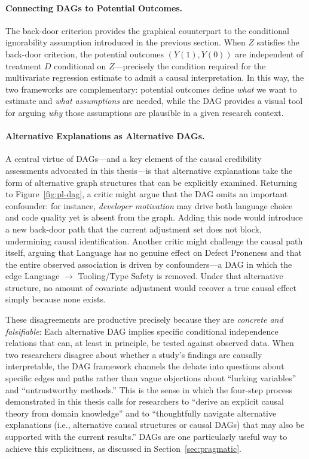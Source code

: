 \paragraph{Connecting DAGs to Potential Outcomes.}
The back-door criterion provides the graphical counterpart to the conditional ignorability assumption introduced in the previous section.
When $Z$ satisfies the back-door criterion, the potential outcomes $(Y(1), Y(0))$ are independent of treatment $D$ conditional on $Z$---precisely the condition required for the multivariate regression estimate to admit a causal interpretation.
In this way, the two frameworks are complementary: potential outcomes define \emph{what} we want to estimate and \emph{what assumptions} are needed, while the DAG provides a visual tool for arguing \emph{why} those assumptions are plausible in a given research context.

\paragraph{Alternative Explanations as Alternative DAGs.}
A central virtue of DAGs---and a key element of the causal credibility assessments advocated in this thesis---is that alternative explanations take the form of alternative graph structures that can be explicitly examined.
Returning to Figure~\ref{fig:pl-dag}, a critic might argue that the DAG omits an important confounder: for instance, \emph{developer motivation} may drive both language choice and code quality yet is absent from the graph.
Adding this node would introduce a new back-door path that the current adjustment set does not block, undermining causal identification.
Another critic might challenge the causal path itself, arguing that Language has no genuine effect on Defect Proneness and that the entire observed association is driven by confounders---a DAG in which the edge Language $\to$ Tooling/Type Safety is removed.
Under that alternative structure, no amount of covariate adjustment would recover a true causal effect simply because none exists.

These disagreements are productive precisely because they are \emph{concrete and falsifiable}: Each alternative DAG implies specific conditional independence relations that can, at least in principle, be tested against observed data.
When two researchers disagree about whether a study's findings are causally interpretable, the DAG framework channels the debate into questions about specific edges and paths rather than vague objections about ``lurking variables'' and ``untrustworthy methods.''
This is the sense in which the four-step process demonstrated in this thesis calls for researchers to ``derive an explicit causal theory from domain knowledge'' and to ``thoughtfully navigate alternative explanations (i.e., alternative causal structures or causal DAGs) that may also be supported with the current results.''
DAGs are one particularly useful way to achieve this explicitness, as discussed in Section~\ref{sec:pragmatic}.

